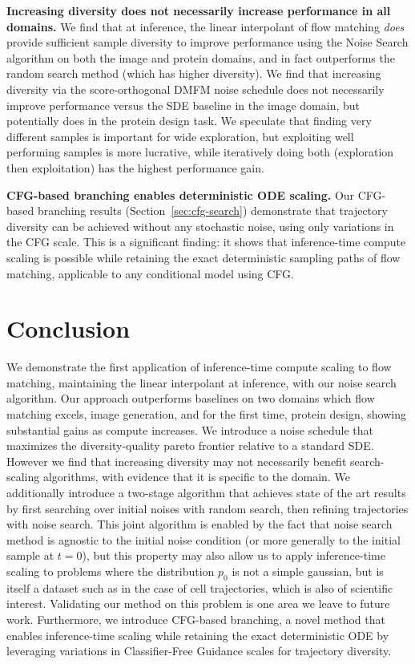 \documentclass{article} %
\newcommand{\rev}[1]{{\color{blue}#1}}
\begin{document}
\textbf{Increasing diversity does not necessarily increase performance in all domains.} We find that at inference, the linear interpolant of flow matching \textit{does} provide sufficient sample diversity to improve performance using the Noise Search algorithm on both the image and protein domains, and in fact outperforms the random search method (which has higher diversity). We find that increasing diversity via the score-orthogonal DMFM noise schedule does not necessarily improve performance versus the SDE baseline in the image domain, but potentially does in the protein design task. We speculate that finding very different samples is important for wide exploration, but exploiting well performing samples is more lucrative, while iteratively doing both (exploration then exploitation) has the highest performance gain.

\rev{\textbf{CFG-based branching enables deterministic ODE scaling.} Our CFG-based branching results (Section~\ref{sec:cfg-search}) demonstrate that trajectory diversity can be achieved without any stochastic noise, using only variations in the CFG scale. This is a significant finding: it shows that inference-time compute scaling is possible while retaining the exact deterministic sampling paths of flow matching, applicable to any conditional model using CFG.}

\section{Conclusion}
We demonstrate the first application of inference-time compute scaling to flow matching, maintaining the linear interpolant at inference, with our noise search algorithm. Our approach outperforms baselines on two domains which flow matching excels, image generation, and for the first time, protein design, showing substantial gains as compute increases. We introduce a noise schedule that maximizes the diversity-quality pareto frontier relative to a standard SDE. However we find that increasing diversity may not necessarily benefit search-scaling algorithms, with evidence that it is specific to the domain. We additionally introduce a two-stage algorithm that achieves state of the art results by first searching over initial noises with random search, then refining trajectories with noise search. This joint algorithm is enabled by the fact that noise search method is agnostic to the initial noise condition (or more generally to the initial sample at $t=0$), but this property may also allow us to apply inference-time scaling to problems where the distribution $p_0$ is not a simple gaussian, but is itself a dataset such as in the case of cell trajectories, which is also of scientific interest. Validating our method on this problem is one area we leave to future work. \rev{Furthermore, we introduce CFG-based branching, a novel method that enables inference-time scaling while retaining the exact deterministic ODE by leveraging variations in Classifier-Free Guidance scales for trajectory diversity.}
\end{document}
